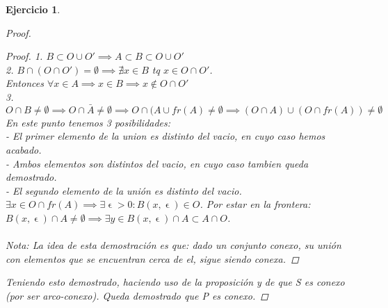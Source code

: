 \documentclass[11pt, a4paper, titlepage]{article}
\let\epsilon\upvarepsilon
\theoremstyle{exercise-style}
\newtheorem*{ejer}{Ejercicio}
\theoremstyle{theorem-style}
\begin{document}
\begin{ejer}
\begin{proof}
\begin{proof}
 1. $B \subset O \cup O' \implies A \subset B \subset O \cup O'$\\
 2. $B \cap (O\cap O') = \emptyset \implies \nexists x \in B$ tq $x \in O \cap O'$. \\
 Entonces $\forall x \in A \implies x \in B \implies x \not\in O \cap O'$\\
 3. $O \cap B \neq \emptyset \implies O\cap \bar{A} \neq \emptyset \implies O\cap (A\cup fr(A) \neq \emptyset \implies (O\cap A)\cup (O\cap fr(A)) \neq \emptyset$
 En este punto tenemos 3 posibilidades:\\
  - El primer elemento de la union es distinto del vacio, en cuyo caso hemos acabado.\\
  - Ambos elementos son distintos del vacio, en cuyo caso tambien queda demostrado.\\
  - El segundo elemento de la unión es distinto del vacio. $\exists x \in O\cap fr(A) \implies \exists \epsilon > 0 : B(x,\epsilon) \in O$. Por estar en la frontera: $B(x,\epsilon)\cap A \neq \emptyset \implies \exists y \in B(x,\epsilon)\cap A \subset A \cap O$.\\\\
  
  Nota: La idea de esta demostración es que: dado un conjunto conexo, su unión con elementos que se encuentran cerca de el, sigue siendo conexa.
  
\end{proof}

Teniendo esto demostrado, haciendo uso de la proposición y de que S es conexo (por ser arco-conexo). Queda demostrado que P es conexo.

\end{proof}

\end{ejer}
\end{document}
